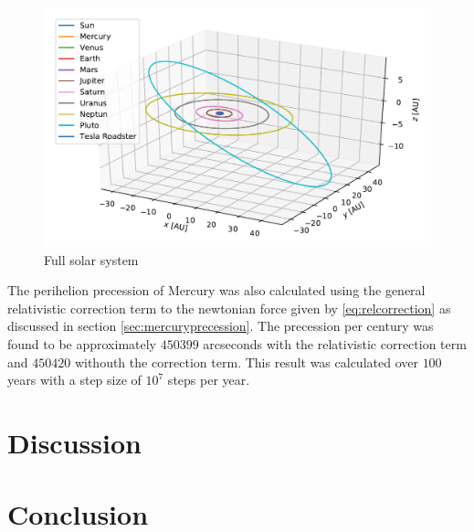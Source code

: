 \documentclass[twocolumn]{aastex62}
\begin{document}
\begin{figure}
\includegraphics[scale=1]{Figures/OuterSolarSystem.pdf}
\caption{Full solar system}
\label{fig:inner}
\end{figure}

The perihelion precession of Mercury was also calculated using the general
relativistic correction term to the newtonian force given by
\ref{eq:relcorrection} as discussed in section \ref{sec:mercuryprecession}. The
precession per century was found to be approximately $450399$ arcseconds with
the relativistic correction term and $450420$ withouth the correction term. This
result was calculated over $100$ years with a step size of $10^7$ steps per year.

\section{Discussion} \label{sec:discussion}

\section{Conclusion} \label{sec:conclusion}

\nocite{jensen:2019}
\newpage


\end{document}
